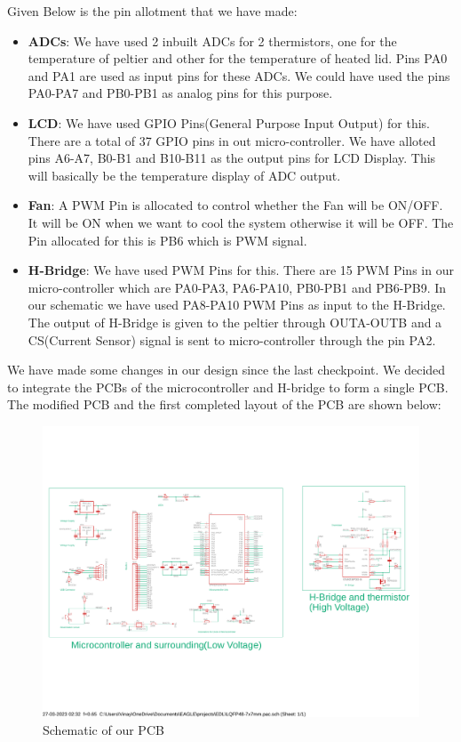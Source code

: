 \documentclass[12pt]{article}
\begin{document}
Given Below is the pin allotment that we have made:\\
\begin{itemize}
    \item \textbf{ADCs}: We have used 2 inbuilt ADCs for 2 thermistors, one for the temperature of peltier and other for the temperature of heated lid. Pins PA0 and PA1 are used as input pins for these ADCs. We could have used the pins PA0-PA7 and PB0-PB1 as analog pins for this purpose.

    \item \textbf{LCD}: We have used GPIO Pins(General Purpose Input Output) for this. There are a total of 37 GPIO pins in out micro-controller. We have alloted pins A6-A7, B0-B1 and B10-B11 as the output pins for LCD Display. This will basically be the temperature display of ADC output.

    \item \textbf{Fan}: A PWM Pin is allocated to control whether the Fan will be ON/OFF. It will be ON when we want to cool the system otherwise it will be OFF. The Pin allocated for this is PB6 which is PWM signal.

    \item \textbf{H-Bridge}: We have used PWM Pins for this. There are 15 PWM Pins in our micro-controller which are PA0-PA3, PA6-PA10, PB0-PB1 and PB6-PB9. In our schematic we have used PA8-PA10 PWM Pins as input to the H-Bridge. The output of H-Bridge is given to the peltier through OUTA-OUTB and a CS(Current Sensor) signal is sent to micro-controller through the pin PA2. 
\end{itemize}

We have made some changes in our design since the last checkpoint. We decided to integrate the PCBs of the microcontroller and H-bridge to form a single PCB. The modified PCB and the first completed layout of the PCB are shown below:

\begin{figure}[htp]
    \centering
    \includegraphics[width=\textwidth]{Images/ourpcbschematic.pdf}
    \caption{Schematic of our PCB}
    \label{fig:galaxy}
\end{figure}
\end{document}
